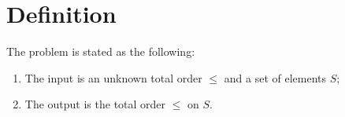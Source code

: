 \section{Definition}
\label{tree:sorting:def}

The problem is stated as the following:

\begin{enumerate}
\item The input is an unknown total order $\le$ and a set of elements $S$;
\item The output is the total order $\le$ on $S$.
\end{enumerate}

